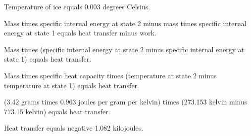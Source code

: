 Temperature of ice equals 0.003 degrees Celsius.  

Mass times specific internal energy at state 2 minus mass times specific internal energy at state 1 equals heat transfer minus work.  

Mass times (specific internal energy at state 2 minus specific internal energy at state 1) equals heat transfer.  

Mass times specific heat capacity times (temperature at state 2 minus temperature at state 1) equals heat transfer.  

(3.42 grams times 0.963 joules per gram per kelvin) times (273.153 kelvin minus 773.15 kelvin) equals heat transfer.  

Heat transfer equals negative 1.082 kilojoules.